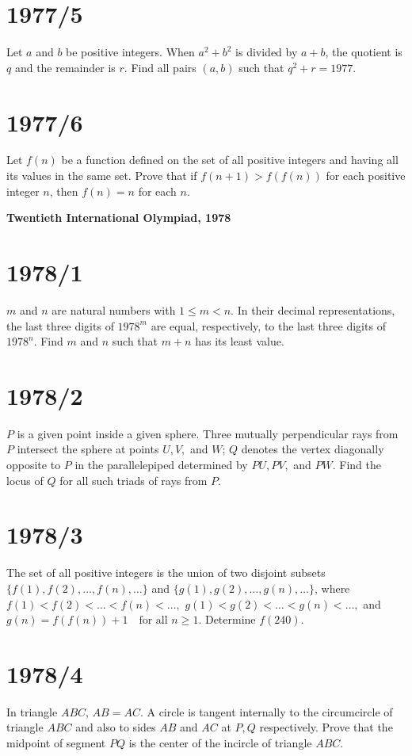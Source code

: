 \documentclass[12pt]{article}
\begin{document}
\section*{1977/5}
Let $a$ and $b$ be positive integers.  
When $a^2 + b^2$ is divided by $a + b$, the quotient is $q$ and the remainder is $r$.  
Find all pairs $(a, b)$ such that $q^2 + r = 1977$.

\section*{1977/6}
Let $f(n)$ be a function defined on the set of all positive integers and having all its values in the same set.  
Prove that if
$
f(n + 1) > f(f(n))
$
for each positive integer $n$, then
$
f(n) = n
$
for each $n$.




\newpage\textbf{Twentieth International Olympiad, 1978}

\section*{1978/1}
$m$ and $n$ are natural numbers with $1 \le m < n$.  
In their decimal representations, the last three digits of $1978^m$ are equal, respectively, to the last three digits of $1978^n$.  
Find $m$ and $n$ such that $m + n$ has its least value.

\section*{1978/2}
$P$ is a given point inside a given sphere.  
Three mutually perpendicular rays from $P$ intersect the sphere at points $U, V,$ and $W$;  
$Q$ denotes the vertex diagonally opposite to $P$ in the parallelepiped determined by $PU, PV,$ and $PW$.  
Find the locus of $Q$ for all such triads of rays from $P$.

\section*{1978/3}
The set of all positive integers is the union of two disjoint subsets  
$\{ f(1), f(2), \dots, f(n), \dots \}$ and $\{ g(1), g(2), \dots, g(n), \dots \}$,  
where
$
f(1) < f(2) < \dots < f(n) < \dots,
$
$
g(1) < g(2) < \dots < g(n) < \dots,
$
and
$
g(n) = f(f(n)) + 1 \quad \text{for all } n \ge 1.
$
Determine $f(240)$.

\section*{1978/4}
In triangle $ABC$, $AB = AC$.  
A circle is tangent internally to the circumcircle of triangle $ABC$ and also to sides $AB$ and $AC$ at $P, Q$ respectively.  
Prove that the midpoint of segment $PQ$ is the center of the incircle of triangle $ABC$.
\end{document}
